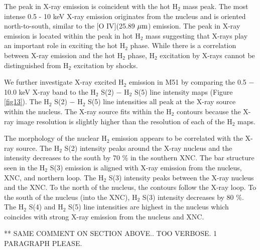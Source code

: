 \documentclass[manuscript]{aastex}
\begin{document}
The peak in X-ray emission is coincident with the hot $\mathrm{H_2}$
mass peak. The most intense 0.5 - 10 keV X-ray emission originates
from the nucleus and is oriented north-to-south, similar to the [O
  IV](25.89 $\mbox{$\mu$m}$) emission.  The peak in X-ray emission is
located within the peak in hot $\mathrm{H_2}$ mass suggesting that
X-rays play an important role in exciting the hot $\mathrm{H_2}$
phase.  While there is a correlation between X-ray emission and the
hot $\mathrm{H_2}$ phase, $\mathrm{H_2}$ excitation by X-rays cannot
be distinguished from $\mathrm{H_2}$ excitation by shocks.



We further investigate X-ray excited $\mathrm{H_2}$ emission in M51 by
comparing the 0.5 $-$ 10.0 keV X-ray band to the $\mathrm{H_2}$ S(2)
$-$ $\mathrm{H_2}$ S(5) line intensity maps (Figure \ref{fig13}).  The
$\mathrm{H_2}$ S(2) $-$ $\mathrm{H_2}$ S(5) line intensities all peak
at the X-ray source within the nucleus.  The X-ray source fits within
the $\mathrm{H_2}$ contours because the X-ray image resolution is
slightly higher than the resolution of each of the $\mathrm{H_2}$
maps.

The morphology of the nuclear $\mathrm{H_2}$ emission appears to be
correlated with the X-ray source.  The $\mathrm{H_2}$ S(2) intensity
peaks around the X-ray nucleus and the intensity decreases to the
south by 70 \% in the southern XNC.  The bar structure seen in the
$\mathrm{H_2}$ S(3) emission is aligned with X-ray emission from the
nucleus, XNC, and northern loop.  The $\mathrm{H_2}$ S(3) intensity
peaks between the X-ray nucleus and the XNC.  To the north of the
nucleus, the contours follow the X-ray loop.  To the south of the
nucleus (into the XNC), $\mathrm{H_2}$ S(3) intensity decreases by 80
\%.  The $\mathrm{H_2}$ S(4) and $\mathrm{H_2}$ S(5) line intensities
are highest in the nucleus which coincides with strong X-ray emission
from the nucleus and XNC.

** SAME COMMENT ON SECTION ABOVE.. TOO VERBOSE. 1 PARAGRAPH PLEASE.
\end{document}
